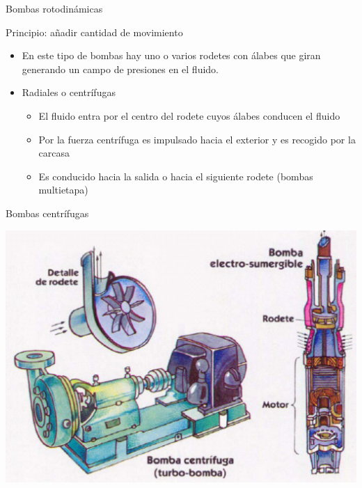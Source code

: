 \documentclass[xcolor={usenames,svgnames,dvipsnames}]{beamer}
\begin{document}
\begin{frame}[label={sec:orgd0802a5}]{Bombas rotodinámicas}
\begin{block}{\alert{Principio}: añadir cantidad de movimiento}
\begin{itemize}
\item En este tipo de bombas hay uno o varios rodetes con álabes que giran generando un campo de presiones en el fluido.

\item \alert{Radiales o centrífugas}

\begin{itemize}
\item El fluido entra por el centro del rodete cuyos álabes conducen el fluido

\item Por la fuerza centrífuga es impulsado hacia el exterior y es recogido por la carcasa

\item Es conducido hacia la salida o hacia el siguiente rodete (bombas multietapa)
\end{itemize}
\end{itemize}
\end{block}
\end{frame}

\begin{frame}[label={sec:org6211c97}]{Bombas centrífugas}
\begin{center}
\includegraphics[width=.9\linewidth]{../figs/BombaCentrifuga.pdf}
\end{center}
\end{frame}
\end{document}
